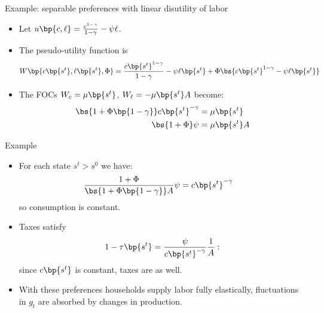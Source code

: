 \documentclass[11pt,xcolor={dvipsnames},aspectratio=159,hyperref={pdftex,pdfpagemode=UseNone,hidelinks,pdfdisplaydoctitle=true},usepdftitle=false]{beamer}
\begin{document}
        
            \begin{frame}{Example: separable preferences with linear disutility of labor}
                \begin{itemize}
                \item Let $u\bp{c,\ell} = \frac{c^{1-\gamma}}{1-\gamma} - \psi \ell $.
                \item The pseudo-utility function is
                \begin{align*}
                    W\bp{c\bp{s^t},\ell\bp{s^t},\Phi} = \frac{c\bp{s^t}^{1-\gamma}}{1-\gamma} - \psi \ell\bp{s^t} + \Phi\bs{c\bp{s^t}^{1-\gamma} - \psi \ell\bp{s^t}}
                \end{align*}
                \item The FOCs $W_c = \mu\bp{s^t}$, $W_\ell = -\mu\bp{s^t} A$ become:
                  \begin{align*}
                    \bs{1+\Phi\bp{1-\gamma}} c\bp{s^t}^{-\gamma} & =  \mu \bp{s^t} \\
                    \bs{1+\Phi}\psi & =   \mu \bp{s^t} A
                  \end{align*}
                \end{itemize}
            \end{frame}
        
            \begin{frame}{Example}
                \begin{itemize}
                \item For each state $s^t>s^0$ we have:
                \begin{align*}
                    \frac{1+\Phi}{\bs{1+\Phi\bp{1-\gamma}}A}\psi & =   c\bp{s^t}^{-\gamma}
                \end{align*}
                so consumption is constant.
                \item Taxes satisfy  
                \begin{align*}
                1-\tau\bp{s^t}  =  \frac{\psi}{c\bp{s^t}^{-\gamma}} \frac{1}{A}:
                \end{align*}
                since $c\bp{s^t}$ is constant, taxes are  as well.
                \item With these preferences households supply labor fully elastically, fluctuations in $g_t$ are absorbed by changes in production.
                \end{itemize}
            \end{frame}
            
\end{document}
